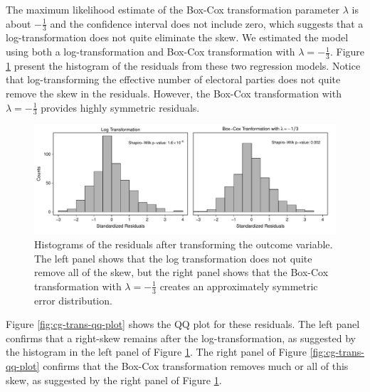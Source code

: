 \documentclass[12pt]{article}
\begin{document}
The maximum likelihood estimate of the Box-Cox transformation parameter $\lambda$ is about $-\frac{1}{3}$ and the confidence interval does not include zero, which suggests that a log-transformation does not quite eliminate the skew. We estimated the model using both a log-transformation and Box-Cox transformation with $\lambda = -\frac{1}{3}$. Figure \ref{fig:cg-trans-residuals-hist} present the histogram of the residuals from these two regression models. Notice that log-transforming the effective number of electoral parties does not quite remove the skew in the residuals. However, the Box-Cox transformation with $\lambda = -\frac{1}{3}$ provides highly symmetric residuals. 

\begin{figure}[H]
\begin{center}
\includegraphics[width = \textwidth]{figs/cg-trans-residuals-hist.pdf}
\caption{Histograms of the residuals after transforming the outcome variable. The left panel shows that the log transformation does not quite remove all of the skew, but the right panel shows that the Box-Cox transformation with $\lambda = -\frac{1}{3}$ creates an approximately symmetric error distribution.}\label{fig:cg-trans-residuals-hist}
\end{center}
\end{figure}

Figure \ref{fig:cg-trans-qq-plot} shows the QQ plot for these residuals. The left panel confirms that a right-skew remains after the log-transformation, as suggested by the histogram in the left panel of Figure \ref{fig:cg-trans-residuals-hist}. The right panel of Figure \ref{fig:cg-trans-qq-plot} confirms that the Box-Cox transformation removes much or all of this skew, as suggested by the right panel of Figure \ref{fig:cg-trans-residuals-hist}. 
\end{document}

